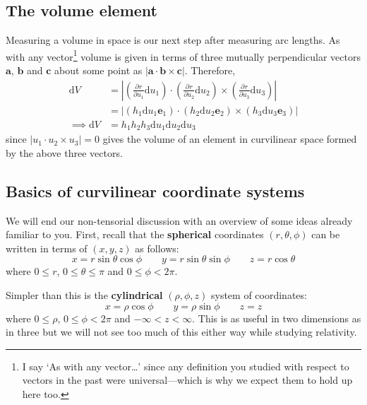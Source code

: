 \documentclass{tufte-handout}
\providecommand*{\pdif}[3][]{\frac{\partial^{#1}#2}{\partial #3^{#1}}}
\begin{document}
\subsection{The volume element}

Measuring a volume in space is our next step after measuring arc lengths. As with any vector\footnote{I say `As with any vector\ldots' since any definition you studied with respect to vectors in the past were universal---which is why we expect them to hold up here too.} volume is given in terms of three mutually perpendicular vectors $\mathbf{a}$, $\mathbf{b}$ and $\mathbf{c}$ about some point as $\left| \mathbf{a \cdot b \times c} \right|$. Therefore,
\begin{align}
	\textrm{d}V &= \left| \left(\pdif{r}{u_1} \textrm{d}u_1 \right) \cdot \left(\pdif{r}{u_2} \textrm{d}u_2 \right) \times \left(\pdif{r}{u_3} \textrm{d}u_3 \right) \right| \nonumber \\
				&= \left| \left(h_1 \textrm{d}u_1 \mathbf{e}_1\right) \cdot \left(h_2 \textrm{d}u_2 \mathbf{e}_2\right) \times \left(h_3 \textrm{d}u_3 \mathbf{e}_3\right) \right| \nonumber \\
\implies \textrm{d}V &= h_1h_2h_3\textrm{d}u_1\textrm{d}u_2\textrm{d}u_3
\end{align}
since $\left| u_1 \cdot u_2 \times u_3 \right| = 0$ gives the volume of an element in curvilinear space formed by the above three vectors.

\subsection{Basics of curvilinear coordinate systems}

We will end our non-tensorial discussion with an overview of some ideas already familiar to you. First, recall that the \textbf{spherical} coordinates $(r,\theta,\phi)$ can be written in terms of $(x,y,z)$ as follows: \[ x = r\sin\theta\cos\phi \qquad y = r\sin\theta\sin\phi \qquad z = r\cos\theta \] where $0 \leq r$, $0 \leq \theta \leq \pi$ and $0 \leq \phi < 2\pi$.

Simpler than this is the \textbf{cylindrical} $(\rho,\phi,z)$ system of coordinates: \[ x = \rho\cos\phi \qquad y = \rho\sin\phi \qquad z = z \] where $0 \leq \rho$, $0 \leq \phi < 2\pi$ and $-\infty < z < \infty$. This is as useful in two dimensions as in three but we will not see too much of this either way while studying relativity.
\end{document}
